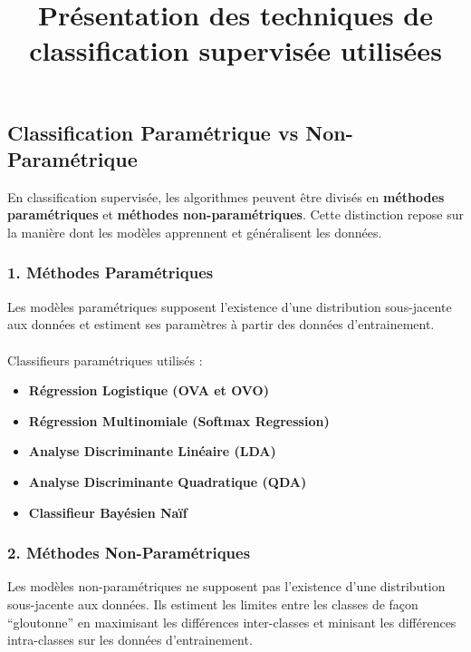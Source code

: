 \documentclass[
]{article}
\title{Présentation des techniques de classification supervisée
utilisées}
\author{}
\date{}
\makeatletter
\let\oldparagraph\paragraph
\renewcommand{\paragraph}{
    \@ifstar
      \xxxParagraphStar
      \xxxParagraphNoStar
  }
\newcommand{\xxxParagraphStar}[1]{\oldparagraph*{#1}\mbox{}}
\newcommand{\xxxParagraphNoStar}[1]{\oldparagraph{#1}\mbox{}}
\providecommand{\tightlist}{%
  \setlength{\itemsep}{0pt}\setlength{\parskip}{0pt}}\usepackage{longtable,booktabs,array}
\makeatother
\begin{document}
\maketitle


\subsection{Classification Paramétrique vs
Non-Paramétrique}\label{classification-paramuxe9trique-vs-non-paramuxe9trique}

En classification supervisée, les algorithmes peuvent être divisés en
\textbf{méthodes paramétriques} et \textbf{méthodes non-paramétriques}.
Cette distinction repose sur la manière dont les modèles apprennent et
généralisent les données.

\subsubsection{1. Méthodes
Paramétriques}\label{muxe9thodes-paramuxe9triques}

Les modèles paramétriques supposent l'existence d'une distribution
sous-jacente aux données et estiment ses paramètres à partir des données
d'entrainement.

\paragraph{Classifieurs paramétriques utilisés
:}\label{classifieurs-paramuxe9triques-utilisuxe9s}

\begin{itemize}
\tightlist
\item
  \textbf{Régression Logistique (OVA et OVO)}
\item
  \textbf{Régression Multinomiale (Softmax Regression)}
\item
  \textbf{Analyse Discriminante Linéaire (LDA)}
\item
  \textbf{Analyse Discriminante Quadratique (QDA)}
\item
  \textbf{Classifieur Bayésien Naïf}
\end{itemize}

\subsubsection{2. Méthodes
Non-Paramétriques}\label{muxe9thodes-non-paramuxe9triques}

Les modèles non-paramétriques ne supposent pas l'existence d'une
distribution sous-jacente aux données. Ils estiment les limites entre
les classes de façon ``gloutonne'' en maximisant les différences
inter-classes et minisant les différences intra-classes sur les données
d'entrainement.
\end{document}
